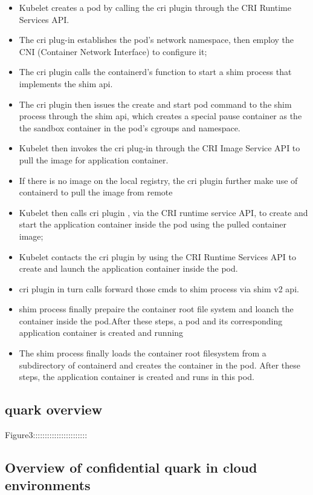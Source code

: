     \begin{itemize}
        \item Kubelet creates a pod by calling the cri plugin through the CRI Runtime Services API.
        \item The cri plug-in establishes the pod's network namespace, then employ the CNI (Container Network Interface) to configure it;
        \item The cri plugin calls the containerd's function to start a shim process that implements the shim api.
        \item The cri plugin then issues the create and start pod command to the shim process through the shim api, which creates a special pause container as the the sandbox container in the pod's cgroups and namespace.
        \item Kubelet then invokes the cri plug-in through the CRI Image Service API to pull the image for application container.
        \item If there is no image on the local registry, the cri plugin further make use of containerd to pull the image from remote
        \item Kubelet then calls cri plugin , via the CRI runtime service API, to create and start the application container inside the pod using the pulled container image;
        \item Kubelet contacts the cri plugin by using the CRI Runtime Services API to create and launch the application container inside the pod.
        \item cri plugin in turn calls forward those cmds to shim process via shim v2 api.
        \item shim process finally prepaire the container root file system  and loanch the container inside the pod.After these steps, a pod and its corresponding application container is created and running
        \item The shim process finally loads the container root filesystem from a subdirectory of containerd and creates the container in the pod. After these steps, the application container is created and runs in this pod.
    \end{itemize}


\subsection{quark overview}

Figure3:::::::::::::::::::::::

\subsection{Overview of confidential quark in cloud environments}

